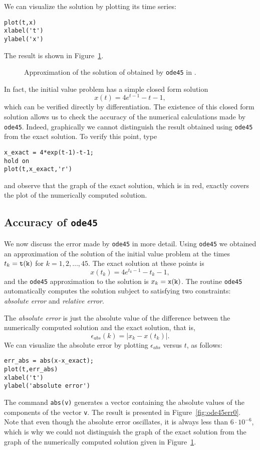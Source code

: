 \documentclass{ximera}
\begin{document}
We can visualize the solution by plotting its time series:
\begin{verbatim}
plot(t,x)
xlabel('t')
ylabel('x')
\end{verbatim}
The result is shown in Figure~\ref{fig:ode45ex1}.  

\begin{figure}[htb]
   \centerline{%
   }
   \caption{Approximation of the solution of
   \protect{} obtained by {\tt ode45} in \protect\Matlabp.}
   \label{fig:ode45ex1}
\end{figure}

In fact, the initial value problem  has a simple closed form 
solution
\[
x(t) = 4e^{t-1}-t-1,
\]
which can be verified directly by differentiation.  The existence of this
closed form solution allows us to check the accuracy of the numerical
calculations made by {\tt ode45}.  Indeed, graphically we cannot distinguish 
the result obtained using {\tt ode45} from the exact 
solution.  To verify this point, type
\begin{verbatim}
x_exact = 4*exp(t-1)-t-1;
hold on
plot(t,x_exact,'r')
\end{verbatim}
and observe that the graph of the exact solution, which is in red, exactly
covers the plot of the numerically computed solution.

\subsection*{Accuracy of {\tt ode45}}

We now discuss the error made by {\tt ode45} in more detail.
Using {\tt ode45} we obtained an approximation of the solution of
the initial value problem  at the times $t_k={\tt t(k)}$
for $k=1,2,\ldots,45$.  The exact solution at these points is
\[
x(t_k)=4e^{t_k-1}-t_k-1,
\]
and the {\tt ode45} approximation to the solution is $x_k={\tt x(k)}$.  The 
routine {\tt ode45} automatically computes the solution subject to satisfying 
two constraints: {\em absolute error} and {\em relative error\/}.

The {\em absolute error} is just the absolute value of
the difference between the numerically computed solution and the exact
solution, that is,
\[
\epsilon_{abs}(k) = |x_k - x(t_k)|.
\]
We can visualize the absolute error by plotting $\epsilon_{abs}$ versus $t$, 
as follows:
\begin{verbatim}
err_abs = abs(x-x_exact);
plot(t,err_abs)
xlabel('t')
ylabel('absolute error')
\end{verbatim}
The \Matlab command {\tt abs(v)} generates a vector containing the absolute 
values of the components of the vector {\tt v}.  The result is presented in 
Figure~\ref{fig:ode45err0}.  Note that even though the absolute error 
oscillates, it is always less than $6\cdot10^{-6}$, which is why we could not 
distinguish the graph of the exact solution from the graph of the numerically 
computed solution given in Figure~\ref{fig:ode45ex1}.
\end{document}
